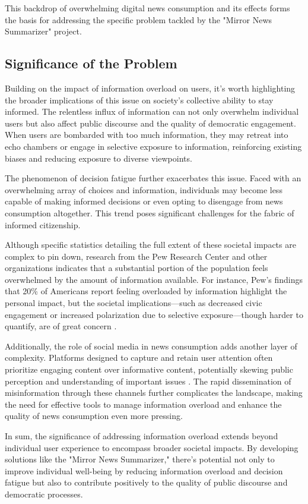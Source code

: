 \documentclass[10pt]{article}
\begin{document}
This backdrop of overwhelming digital news consumption and its effects forms the basis for addressing the specific problem tackled by the "Mirror News Summarizer" project. 

\subsection{Significance of the Problem}
Building on the impact of information overload on users, it's worth highlighting the broader implications of this issue on society's collective ability to stay informed. The relentless influx of information can not only overwhelm individual users but also affect public discourse and the quality of democratic engagement. When users are bombarded with too much information, they may retreat into echo chambers or engage in selective exposure to information, reinforcing existing biases and reducing exposure to diverse viewpoints.

The phenomenon of decision fatigue further exacerbates this issue. Faced with an overwhelming array of choices and information, individuals may become less capable of making informed decisions or even opting to disengage from news consumption altogether. This trend poses significant challenges for the fabric of informed citizenship.

Although specific statistics detailing the full extent of these societal impacts are complex to pin down, research from the Pew Research Center and other organizations indicates that a substantial portion of the population feels overwhelmed by the amount of information available. For instance, Pew's findings that 20\% of Americans report feeling overloaded by information highlight the personal impact, but the societal implications—such as decreased civic engagement or increased polarization due to selective exposure—though harder to quantify, are of great concern \cite{pewnewsplatforms} .

Additionally, the role of social media in news consumption adds another layer of complexity. Platforms designed to capture and retain user attention often prioritize engaging content over informative content, potentially skewing public perception and understanding of important issues  \cite{frontiersinpsych2022} . The rapid dissemination of misinformation through these channels further complicates the landscape, making the need for effective tools to manage information overload and enhance the quality of news consumption even more pressing.

In sum, the significance of addressing information overload extends beyond individual user experience to encompass broader societal impacts. By developing solutions like the "Mirror News Summarizer," there's potential not only to improve individual well-being by reducing information overload and decision fatigue but also to contribute positively to the quality of public discourse and democratic processes.
\end{document}

